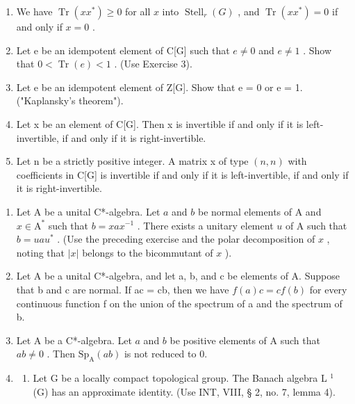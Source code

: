 \begin{enumerate}
\def\labelenumi{\alph{enumi})}
\setcounter{enumi}{4}
\item
  We have \(\operatorname{Tr}(xx^{*}) \geqslant 0\) for all \(x\) into \(\operatorname{Stell}_r(G)\) , and \(\operatorname{Tr}(xx^{*}) = 0\) if and only if \(x = 0\) .
\item
  Let e be an idempotent element of C{[}G{]} such that \(e \neq 0\) and \(e \neq 1\) . Show that \(0 < \operatorname{Tr}(e) < 1\) . (Use Exercise 3).
\item
  Let e be an idempotent element of Z{[}G{]}. Show that e = 0 or e = 1. ("Kaplansky's theorem").
\item
  Let x be an element of C{[}G{]}. Then x is invertible if and only if it is left-invertible, if and only if it is right-invertible.
\item
  Let n be a strictly positive integer. A matrix x of type \((n, n)\) with coefficients in C{[}G{]} is invertible if and only if it is left-invertible, if and only if it is right-invertible.
\end{enumerate}

\begin{enumerate}
\def\labelenumi{\arabic{enumi})}
\setcounter{enumi}{25}
\item
  Let A be a unital C*-algebra. Let \(a\) and \(b\) be normal elements of A and \(x \in \mathrm{A}^*\) such that \(b = xax^{-1}\) . There exists a unitary element \(u\) of A such that \(b = uau^*\) . (Use the preceding exercise and the polar decomposition of \(x\) , noting that \(|x|\) belongs to the bicommutant of \(x\) ).
\item
  Let A be a unital C*-algebra, and let a, b, and c be elements of A. Suppose that b and c are normal. If ac = cb, then we have \(f(a)c = cf(b)\) for every continuous function f on the union of the spectrum of a and the spectrum of b.
\item
  Let A be a C*-algebra. Let \(a\) and \(b\) be positive elements of A such that \(ab \neq 0\) . Then \(\mathrm{Sp}_{\mathrm{A}}(ab)\) is not reduced to 0.
\item
  \begin{enumerate}
  \def\labelenumii{\alph{enumii})}
  \tightlist
  \item
    Let G be a locally compact topological group. The Banach algebra L \(^{1}\) (G) has an approximate identity. (Use INT, VIII, § 2, no. 7, lemma 4).
  \end{enumerate}
\end{enumerate}

